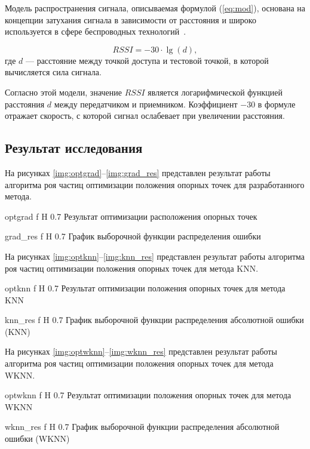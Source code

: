 Модель распространения сигнала, описываемая формулой (\ref{eq:mod}), основана на концепции затухания сигнала в зависимости от расстояния и широко используется в сфере беспроводных технологий~\cite{propagation}.

\begin{equation}
    RSSI = -30 \cdot \lg(d),
    \label{eq:mod}
\end{equation}
где $d$ --- расстояние между точкой доступа и тестовой точкой, в которой вычисляется сила сигнала.

Согласно этой модели, значение $RSSI$ является логарифмической функцией расстояния $d$ между передатчиком и приемником. Коэффициент $-30$ в формуле отражает скорость, с которой сигнал ослабевает при увеличении расстояния.

\clearpage

\subsection{Результат исследования}

На рисунках \ref{img:optgrad}--\ref{img:grad_res} представлен результат работы алгоритма роя частиц оптимизации положения опорных точек для разработанного метода.

    {optgrad}
    {f}
    {H}
    {0.7\linewidth}
    {Результат оптимизации расположения опорных точек}

    {grad_res}
    {f}
    {H}
    {0.7\linewidth}
    {График выборочной функции распределения ошибки}

На рисунках \ref{img:optknn}--\ref{img:knn_res} представлен результат работы алгоритма роя частиц оптимизации положения опорных точек для метода KNN.

    {optknn}
    {f}
    {H}
    {0.7\linewidth}
    {Результат оптимизации положения опорных точек для метода KNN}

    {knn_res}
    {f}
    {H}
    {0.7\linewidth}
    {График выборочной функции распределения абсолютной ошибки (KNN)}

\clearpage

На рисунках \ref{img:optwknn}--\ref{img:wknn_res} представлен результат работы алгоритма роя частиц оптимизации положения опорных точек для метода WKNN.

    {optwknn}
    {f}
    {H}
    {0.7\linewidth}
    {Результат оптимизации положения опорных точек для метода WKNN}

    {wknn_res}
    {f}
    {H}
    {0.7\linewidth}
    {График выборочной функции распределения абсолютной ошибки (WKNN)}

